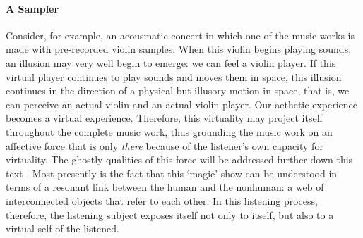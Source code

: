 \paragraph{A Sampler}
Consider, for example, an acousmatic concert in which one of the music works is made with pre-recorded violin samples. When this violin begins playing sounds, an illusion may very well begin to emerge: we can feel a violin player. If this virtual player continues to play sounds and moves them in space, this illusion continues in the direction of a physical but illusory motion in space, that is, we can perceive an actual violin and an actual violin player. Our aethetic experience becomes a virtual experience. Therefore, this virtuality may project itself throughout the complete music work, thus grounding the music work on an affective force that is only \textit{there} because of the listener's own capacity for virtuality. The ghostly qualities of this force will be addressed further down this text . Most presently is the fact that this `magic' show can be understood in terms of a resonant link between the human and the nonhuman: a web of interconnected objects that refer to each other. In this listening process, therefore, the listening subject exposes itself not only to itself, but also to a virtual self of the listened. 

